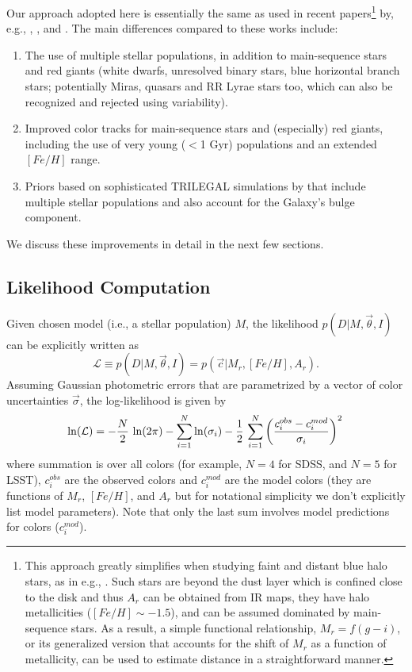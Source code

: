 Our approach adopted here is essentially the same as used in recent papers\footnote{This approach greatly simplifies when studying
faint and distant blue halo stars, as in e.g., \cite{2008ApJ...673..864J}. Such stars are beyond the dust layer which is confined close
to the disk and thus $A_r$ can be obtained from IR maps, they have halo metallicities ($[Fe/H] \sim -1.5$), and can be assumed dominated
by main-sequence stars. As a result, a simple functional relationship, $M_r = f(g-i)$, or its generalized version that
accounts for the shift of $M_r$ as a function of metallicity, \citep{2008ApJ...684..287I} can be used to estimate distance
in a straightforward manner.}
by, e.g., \cite{2011MNRAS.411..435B},  \cite{2014ApJ...783..114G},  \cite{green_3d_2019} and \cite{bailer-jones_estimating_2021}.
The main differences compared to these works include: 
\begin{enumerate}
\item The use of multiple stellar populations, in addition to main-sequence stars and red giants (white dwarfs, unresolved binary stars,
                blue horizontal branch stars; potentially Miras, quasars and RR Lyrae stars too, which can also be recognized and rejected using variability).
\item Improved color tracks for main-sequence stars and (especially) red giants, including the use of very young ($<$1 Gyr) populations 
               and an extended $[Fe/H]$ range. 
\item Priors based on sophisticated TRILEGAL simulations by \cite{2022ApJS..262...22D} that include multiple stellar populations and
               also account for the Galaxy's bulge component. 
\end{enumerate}
             
We discuss these improvements in detail in the next few sections. 


\subsection{Likelihood Computation}

Given chosen model (i.e., a stellar population) $M$, the likelihood $p(D|M,\vec{\theta},I)$ can be explicitly written as
\begin{equation}
        \mathcal{L} \equiv p(D|M,\vec{\theta},I) = p(\vec{c}|M_r, [Fe/H], A_r).
\end{equation}
Assuming Gaussian photometric errors that are parametrized by a vector of color uncertainties $\vec{\sigma}$,
the log-likelihood is given by
\begin{equation}
   \label{eq:lnLcolors}
   \ln (\mathcal{L}) =  - {N \over 2} \, \ln(2\pi) - \sum_{i=1}^N \ln(\sigma_i) - {1 \over 2} \,\sum_{i=1}^N \left({ c^{obs}_i - c^{mod}_i  \over \sigma_i } \right)^2 \,
\end{equation}
where summation is over all colors (for example, $N=4$ for SDSS, and $N=5$ for LSST), \ensuremath{c^{obs}_i} are the
observed colors and \ensuremath{c^{mod}_i} are the model colors (they are functions of $M_r$, $[Fe/H]$, and $A_r$
but for notational simplicity we don't explicitly list model parameters). Note that only the last sum involves model predictions
for colors ($c^{mod}_i$).


